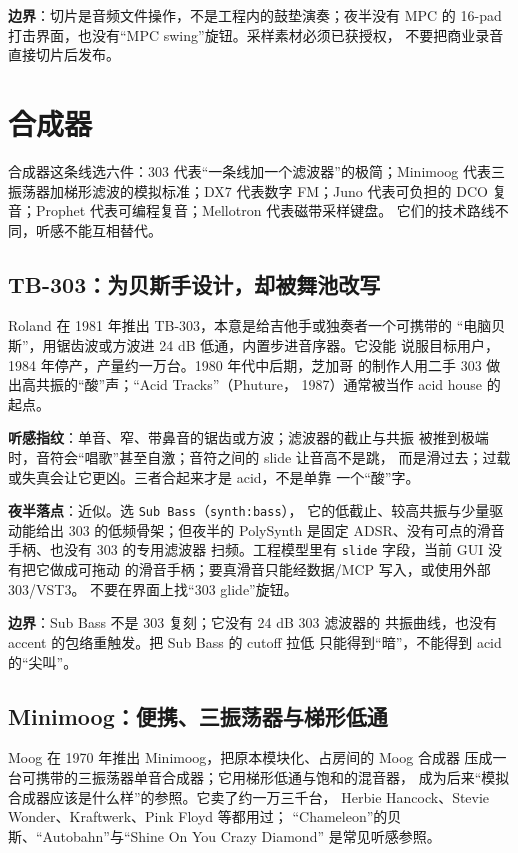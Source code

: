 \textbf{边界}：切片是音频文件操作，不是工程内的鼓垫演奏；夜半没有
MPC 的 16-pad 打击界面，也没有“MPC swing”旋钮。采样素材必须已获授权，
不要把商业录音直接切片后发布。

\section{合成器}
\label{sec:iconic-synths}

合成器这条线选六件：303 代表“一条线加一个滤波器”的极简；Minimoog
代表三振荡器加梯形滤波的模拟标准；DX7 代表数字 FM；Juno 代表可负担的
DCO 复音；Prophet 代表可编程复音；Mellotron 代表磁带采样键盘。
它们的技术路线不同，听感不能互相替代。

\subsection{TB-303：为贝斯手设计，却被舞池改写}
\label{sec:iconic-303}

Roland 在 1981 年推出 TB-303，本意是给吉他手或独奏者一个可携带的
“电脑贝斯”，用锯齿波或方波进 24 dB 低通，内置步进音序器。它没能
说服目标用户，1984 年停产，产量约一万台。1980 年代中后期，芝加哥
的制作人用二手 303 做出高共振的“酸”声；“Acid Tracks”（Phuture，
1987）通常被当作 acid house 的起点。

\textbf{听感指纹}：单音、窄、带鼻音的锯齿或方波；滤波器的截止与共振
被推到极端时，音符会“唱歌”甚至自激；音符之间的 slide 让音高不是跳，
而是滑过去；过载或失真会让它更凶。三者合起来才是 acid，不是单靠
一个“酸”字。

\textbf{夜半落点}：近似。选 \texttt{Sub Bass}（\texttt{synth:bass}），
它的低截止、较高共振与少量驱动能给出 303 的低频骨架；但夜半的
PolySynth 是固定 ADSR、没有可点的滑音手柄、也没有 303 的专用滤波器
扫频。工程模型里有 \texttt{slide} 字段，当前 GUI 没有把它做成可拖动
的滑音手柄；要真滑音只能经数据/MCP 写入，或使用外部 303/VST3。
不要在界面上找“303 glide”旋钮。

\textbf{边界}：Sub Bass 不是 303 复刻；它没有 24 dB 303 滤波器的
共振曲线，也没有 accent 的包络重触发。把 Sub Bass 的 cutoff 拉低
只能得到“暗”，不能得到 acid 的“尖叫”。

\subsection{Minimoog：便携、三振荡器与梯形低通}
\label{sec:iconic-minimoog}

Moog 在 1970 年推出 Minimoog，把原本模块化、占房间的 Moog 合成器
压成一台可携带的三振荡器单音合成器；它用梯形低通与饱和的混音器，
成为后来“模拟合成器应该是什么样”的参照。它卖了约一万三千台，
Herbie Hancock、Stevie Wonder、Kraftwerk、Pink Floyd 等都用过；
“Chameleon”的贝斯、“Autobahn”与“Shine On You Crazy Diamond”
是常见听感参照。

